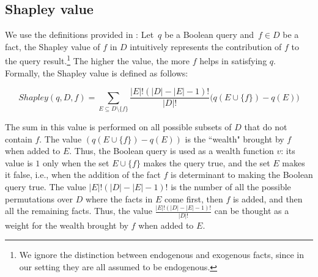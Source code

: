 \documentclass[preprint,12pt,sort&compress]{elsarticle}
\newcommand{\rtwo}[1]{\textcolor{reviewer2}{#1}}
\newtheorem{definition}{Definition}[section]
\newcommand{\eat}[1]{}
\begin{document}

\rtwo{\subsection{Shapley value}}
\label{sec:shapley_value}

\eat{
We use the definitions provided in \cite{DFKM22}:  
given a query $q(\bar{x})$, a database $D$, an input fact $f \in D$ and a tuple $\bar{t}$ of same arity as $\bar{x}$, the Shapley value of $f$ in $D$ intuitively represents the contribution of $f$ to the presence (or absence) of $\bar{t}$ in the query result.

\begin{definition}{Shapley value \cite{DFKM22}}\\
	Let the database instance $I$ be partitioned into two sets of facts: a set $I^x$ of  exogenous facts, and a set $I^n$ of endogenous facts. Let $Q$ be a Boolean query and $f \in I^n$ be an endogenous fact. The Shapley value of $f$ in $I$ for query $Q$ is defined as:
	\begin{multline*}
		Shapley(Q, I^n, I^x, f) = \\ \sum_{B \subseteq I^n\backslash \{ f \}}\frac{|B|!(|I^n| - |B| - 1)!}{|I^n|!}  \left(Q(I^x \cup B \cup \{ f\} ) - Q(I^x \cup B)\right)
	\end{multline*}
\end{definition}
}
We use the definitions provided in \cite{DFKM22}:  
Let~$q$ be a Boolean query and~$f
\in D$ be a fact, the Shapley value of $f$ in $D$ intuitively represents the contribution of $f$ to the query result.\footnote{We ignore the distinction between endogenous and exogenous facts, since in our setting they are all assumed to be endogenous. }
The higher the value, the more $f$ helps in satisfying $q$.
Formally, the Shapley value is defined as follows:

\[
Shapley(q,D,f)= 
\sum_{E\subseteq D \setminus \{f\}} \frac{|E|!(|D|-|E|-1)!}{|D|!} \bigg(
q(E\cup \{f\}) - q(E)\bigg)
\]

\noindent
The sum in this value is performed on all possible subsets of $D$ that do not contain $f$. The value $\left(q(E \cup \{ f\} ) - q(E)\right)$ is the ``wealth" brought by $f$ when added to $E$. 
Thus, the Boolean query is used as a wealth function $v$: its value is $1$ only when the set $E \cup \{ f\}$ makes the query true, and the set $E$ makes it false, i.e., when the addition of the fact $f$ is determinant to making the Boolean query true. 
The value $|E|!(|D| - |E| - 1)!$ is the number of all the possible permutations over $D$ where the facts in $E$ come first, then $f$ is added, and then all the remaining facts. Thus, the value $\frac{|E|!(|D| - |E| - 1)!}{|D|!}$ can be thought as a weight for the wealth brought by $f$ when added to $E$. 
\end{document}
